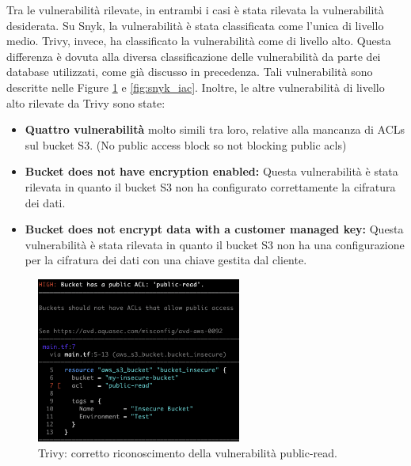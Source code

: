 Tra le vulnerabilità rilevate, in entrambi i casi è stata rilevata la vulnerabilità desiderata. Su Snyk, la vulnerabilità è stata classificata come l'unica di livello medio. Trivy, invece, ha classificato la vulnerabilità come di livello alto. Questa differenza è dovuta alla diversa classificazione delle vulnerabilità da parte dei database utilizzati, come già discusso in precedenza. Tali vulnerabilità sono descritte nelle Figure \ref{fig:trivy_iac} e \ref{fig:snyk_iac}.
Inoltre, le altre vulnerabilità di livello alto rilevate da Trivy sono state:
\begin{itemize}
   \item \textbf{Quattro vulnerabilità} molto simili tra loro, relative alla mancanza di ACLs sul bucket S3. (No public access block so not blocking public acls)
   \item \textbf{Bucket does not have encryption enabled:} Questa vulnerabilità è stata rilevata in quanto il bucket S3 non ha configurato correttamente la cifratura dei dati.
   \item \textbf{Bucket does not encrypt data with a customer managed key:} Questa vulnerabilità è stata rilevata in quanto il bucket S3 non ha una configurazione per la cifratura dei dati con una chiave gestita dal cliente.

\end{itemize}

\begin{figure}[H]
   \centering
   \includegraphics[width=0.6\textwidth]{immagini/capitolo2/trivy_iac.png}
   \caption{Trivy: corretto riconoscimento della vulnerabilità public-read.}
   \label{fig:trivy_iac}
\end{figure}

